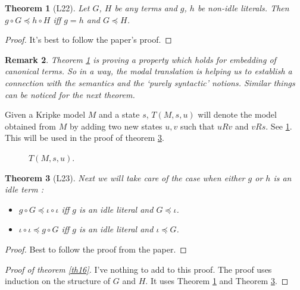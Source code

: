\documentclass[10pt]{article}
\newcommand{\id}{\iota}
\newcommand{\cle}{\preccurlyeq}
\newtheorem{theorem}{Theorem}
\newtheorem{remark}[theorem]{Remark}
\begin{document}
		\begin{theorem}[L22]\label{th25}
			Let $G$, $H$ be any terms and $g$, $h$ be non-idle literals. Then
			$g\circ G\cle h\circ H$ iﬀ $g= h$ and $G\cle H$.
		\end{theorem}
		\begin{proof}
			It's best to follow the paper's proof.
		\end{proof}
		\begin{remark}
			Theorem \ref{th25} is proving a property which holds for \textit{embedding} of canonical terms. So in a way, the modal translation is helping us to establish a connection with the semantics and the `purely syntactic' notions. Similar things can  be noticed for the next theorem.
		\end{remark}
		Given a Kripke model $M$ and a state $s$, $T(M,s,u)$ will denote the model obtained from $M$ by adding two new states $u,v$ such that $uRv$ and $vRs$. See \ref{fig2}. This will be used in the proof of theorem \ref{th27}.
		\begin{figure}[ht]
			\centering
			\caption{$T(M,s,u)$.}
			\label{fig2}
		\end{figure}
		\begin{theorem}[L23]\label{th27}
			Next we will take care of the case when either $g$ or $h$ is an idle term :
			\begin{itemize}
				\item $g\circ G\cle \id\circ\id$ iﬀ $g$ is an idle literal and $G\cle \id$.
				\item $\id\circ \id\cle g\circ G$ iﬀ $g$ is an idle literal and $\iota\cle G$.
			\end{itemize}
		\end{theorem}
	\begin{proof}
			Best to follow the proof from the paper.
		\end{proof}
		
		\begin{proof}[Proof of theorem \ref{th16}]
			I've nothing to add to this proof. The proof uses induction on the structure of $G$ and $H$. It uses Theorem \ref{th25} and Theorem \ref{th27}.
		\end{proof}
		
\end{document}
